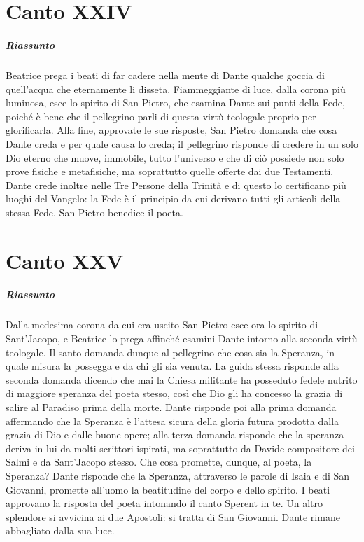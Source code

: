 \documentclass[a4paper, twoside, titlepage]{book}
\begin{document}
\chapter{Canto XXIV}

\paragraph{Riassunto} Beatrice prega i beati di far cadere nella mente di Dante qualche goccia di quell’acqua che eternamente li disseta. Fiammeggiante di luce, dalla corona più luminosa, esce lo spirito di San Pietro, che esamina Dante sui punti della Fede, poiché è bene che il pellegrino parli di questa virtù teologale proprio per glorificarla. Alla fine, approvate le sue risposte, San Pietro domanda che cosa Dante creda e per quale causa lo creda; il pellegrino risponde di credere in un solo Dio eterno che muove, immobile, tutto l’universo e che di ciò possiede non solo prove fisiche e metafisiche, ma soprattutto quelle offerte dai due Testamenti. Dante crede inoltre nelle Tre Persone della Trinità e di questo lo certificano più luoghi del Vangelo: la Fede è il principio da cui derivano tutti gli articoli della stessa Fede. San Pietro benedice il poeta.

\chapter{Canto XXV}

\paragraph{Riassunto} Dalla medesima corona da cui era uscito San Pietro esce ora lo spirito di Sant’Jacopo, e Beatrice lo prega affinché esamini Dante intorno alla seconda virtù teologale. Il santo domanda dunque al pellegrino che cosa sia la Speranza, in quale misura la possegga e da chi gli sia venuta. La guida stessa risponde alla seconda domanda dicendo che mai la Chiesa militante ha posseduto fedele nutrito di maggiore speranza del poeta stesso, così che Dio gli ha concesso la grazia di salire al Paradiso prima della morte. Dante risponde poi alla prima domanda affermando che la Speranza è l’attesa sicura della gloria futura prodotta dalla grazia di Dio e dalle buone opere; alla terza domanda risponde che la speranza deriva in lui da molti scrittori ispirati, ma soprattutto da Davide compositore dei Salmi e da Sant’Jacopo stesso. Che cosa promette, dunque, al poeta, la Speranza? Dante risponde che la Speranza, attraverso le parole di Isaia e di San Giovanni, promette all’uomo la beatitudine del corpo e dello spirito. I beati approvano la risposta del poeta intonando il canto Sperent in te. Un altro splendore si avvicina ai due Apostoli: si tratta di San Giovanni. Dante rimane abbagliato dalla sua luce.
\end{document}
